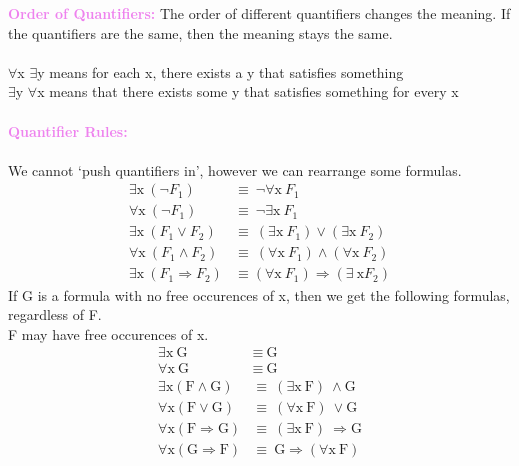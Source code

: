 \documentclass[a4paper,10pt]{article}
\begin{document}
\noindent \textcolor{Violet}{\textbf{Order of Quantifiers:}} The order of different quantifiers changes the meaning. If the quantifiers are the same, then the meaning stays the same.\\ \\
\indent $\forall$x $\exists$y means for each x, there exists a y that satisfies something \\
\indent $\exists$y $\forall$x means that there exists some y that satisfies something for every x \\\\
\noindent \textcolor{Violet}{\textbf{Quantifier Rules:}} \\ \\
\indent We cannot `push quantifiers in', however we can rearrange some formulas. 
\begin{align*}
\exists \textrm{x} \ (\neg F_{1}) &\equiv \ \neg \forall \textrm{x} \  F_{1} \\
\forall \textrm{x} \ (\neg F_{1}) &\equiv \ \neg \exists \textrm{x} \ F_{1} \\
\exists \textrm{x} \ (F_{1} \lor F_{2}) &\equiv \ (\exists \textrm{x} \ F_{1}) \lor (\exists \textrm{x} \ F_{2})\\
\forall \textrm{x} \ (F_{1} \land F_{2}) &\equiv \ (\forall \textrm{x} \ F_{1}) \land (\forall \textrm{x} \ F_{2})\\
\exists \textrm{x} \ (F_{1} \Rightarrow F_{2}) &\equiv (\forall \textrm{x} \ F_{1}) \Rightarrow (\exists \ \textrm{x} F_{2})
\end{align*}
\indent If G is a formula with no free occurences of x, then we get the following formulas, regardless of F. \\ 
\indent F may have free occurences of x. 
\begin{align*}
\exists \textrm{x} \ \textrm{G} &\equiv \ \textrm{G}\\
\forall \textrm{x} \ \textrm{G} &\equiv \ \textrm{G} \\ 
\exists \textrm{x} (\textrm{F} \land \textrm{G}) &\equiv \ (\exists \textrm{x} \ \textrm{F}) \ \land \textrm{G} \\
\forall \textrm{x} (\textrm{F} \lor \textrm{G}) &\equiv \ (\forall \textrm{x} \ \textrm{F}) \ \lor \textrm{G} \\
\forall \textrm{x} (\textrm{F} \Rightarrow \textrm{G}) &\equiv \ (\exists \textrm{x} \ \textrm{F}) \ \Rightarrow \textrm{G} \\
\forall \textrm{x} (\textrm{G} \Rightarrow \textrm{F}) &\equiv \ \textrm{G} \Rightarrow (\forall \textrm{x} \ \textrm{F}) \\
\end{align*}
\end{document}
